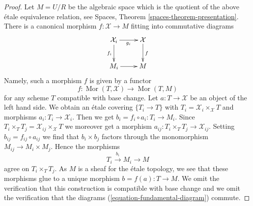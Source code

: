 \documentclass[10pt,a4paper]{amsart}
\theoremstyle{plain}
\theoremstyle{definition}
\theoremstyle{remark}
\numberwithin{equation}{subsection}
\def\Mor{\mathop{\mathrm{Mor}}\nolimits}
\begin{document}
\begin{proof}
\medskip\noindent
Let $M = U/R$ be the algebraic space which is the quotient of the above
\'etale equivalence relation, see
Spaces, Theorem \ref{spaces-theorem-presentation}.
There is a canonical morphism $f : \mathcal{X} \to M$
fitting into commutative diagrams
\begin{equation}
\label{equation-fundamental-diagram}
\xymatrix{
\mathcal{X}_i \ar[r]_{g_i} \ar[d]_{f_i} & \mathcal{X} \ar[d]^f \\
M_i \ar[r] & M
}
\end{equation}
Namely, such a morphism $f$ is given by a functor
$$
f : \Mor(T, \mathcal{X}) \longrightarrow \Mor(T, M)
$$
for any scheme $T$ compatible with base change. Let $a : T \to \mathcal{X}$
be an object of the left hand side. We obtain an \'etale covering
$\{T_i \to T\}$ with $T_i = \mathcal{X}_i \times_\mathcal{X} T$
and morphisms $a_i : T_i \to \mathcal{X}_i$. Then we get
$b_i = f_i \circ a_i : T_i \to M_i$. Since
$T_i \times_T T_j = \mathcal{X}_{ij} \times_\mathcal{X} T$
we moreover get a morphism $a_{ij} : T_i \times_T T_j \to \mathcal{X}_{ij}$.
Setting $b_{ij} = f_{ij} \circ a_{ij}$ we find that
$b_i \times b_j$ factors through the monomorphism
$M_{ij} \to M_i \times M_j$. Hence the morphisms
$$
T_i \xrightarrow{b_i} M_i \to M
$$
agree on $T_i \times_T T_j$. As $M$ is a sheaf for the \'etale
topology, we see that these morphisms glue to a unique
morphism $b = f(a) : T \to M$. We omit the verification that
this construction is compatible with base change and we omit
the verification that the diagrams
(\ref{equation-fundamental-diagram}) commute.


\end{proof}
\end{document}
